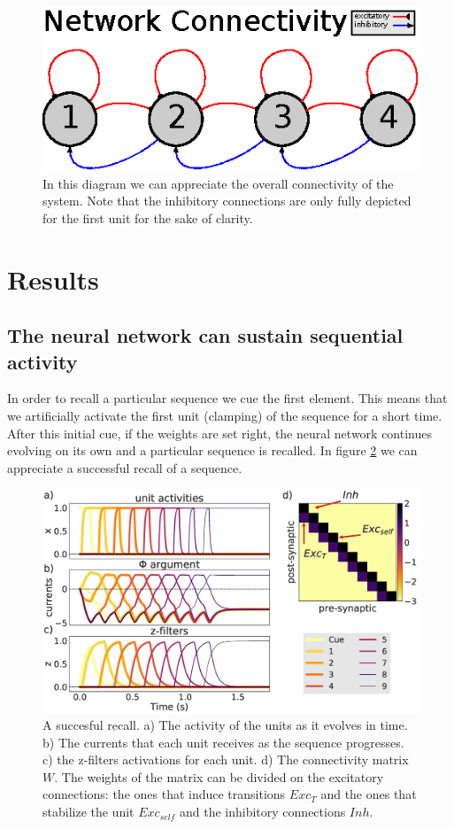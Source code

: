\documentclass{esannV2}
\begin{document}
\begin{figure}[h!]
\centering
\includegraphics[scale=1.5]{diagram.eps}
\caption{In this diagram we can appreciate the overall connectivity of the system. Note that the inhibitory connections are only fully depicted for the first unit for the sake of clarity.}\label{Fig:diagram}
\end{figure}

 
\section{Results}

\subsection{The neural network can sustain sequential activity}

In order to recall a particular sequence we cue the first element. This means that we artificially activate the first unit (clamping) of the sequence for a short time. After this initial cue, if the weights are set right, the neural network continues evolving on its own and a particular sequence is recalled. In figure \ref{Fig:recall} we can appreciate a successful recall of a sequence. 

\begin{figure}[h!]
\centering
\includegraphics[scale=0.20]{recall.eps}
\caption{A succesful recall. a) The activity of the units as it evolves in time. b) The currents that each unit receives as the sequence progresses. c) the z-filters activations for each unit. d) The connectivity matrix $W$. The weights of the matrix can be divided on the excitatory connections: the ones that induce transitions $Exc_{T}$ and the ones that stabilize the unit $Exc_{self}$ and the inhibitory connections $Inh$.}\label{Fig:recall}
\end{figure}
\end{document}
